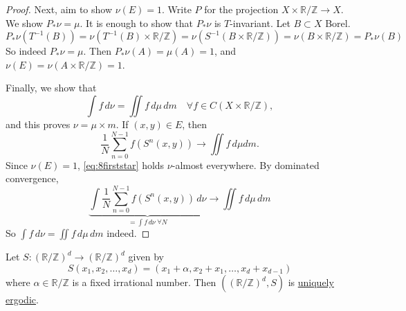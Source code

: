 \documentclass{article}
\begin{document}
\begin{proof}
  Next, aim to show $\nu(E) = 1$.
  Write $P$ for the projection $X \times \mathbb{R} / \mathbb{Z} \to X$. We show $P_* \nu = \mu$.
  It is enough to show that $P_* \nu$ is $T$-invariant.
  Let $B \subset X$ Borel.
  \begin{equation*}
    P_* \nu(T^{-1}(B)) = \nu(T^{-1} (B) \times \mathbb{R}/\mathbb{Z}) = \nu(S^{-1} (B \times \mathbb{R}/\mathbb{Z})) = \nu(B \times \mathbb{R}/\mathbb{Z}) = P_*\nu(B)
  \end{equation*}
  So indeed $P_*\nu= \mu$.
  Then $P_*\nu(A) = \mu(A) = 1$, and $\nu(E) = \nu(A \times \mathbb{R}/\mathbb{Z}) = 1$.

  Finally, we show that
  \begin{equation*}
    \int f\,d\nu=\iint f\,d\mu\,dm \quad \forall f \in C(X \times \mathbb{R}/\mathbb{Z}),
  \end{equation*}
  and this proves $\nu = \mu \times m$.
  If $(x,y) \in E$, then
  \begin{equation*}
    \frac{1}{N} \sum_{n=0}^{N-1} f(S^n(x,y)) \to \iint f \, d\mu dm. \tag{$*$} \label{eq:8firststar}
  \end{equation*}
  Since $\nu(E) = 1$, \eqref{eq:8firststar} holds $\nu$-almost everywhere.
  By dominated convergence,
  \begin{equation*}
    \underbrace{\int \frac{1}{N} \sum_{n=0}^{N-1} f(S^n(x,y))\, d\nu }_{=\int\!f\,d\nu \; \forall N} \to \iint f\,d\mu\,dm %
  \end{equation*}
  So $\int f \,d\nu = \iint f\,d\mu\,dm$ indeed.
\end{proof}
\begin{cor}
  Let $S : (\mathbb{R}/\mathbb{Z})^d \to (\mathbb{R}/\mathbb{Z})^d$ given by
  \begin{equation*}
    S(x_1, x_2, \dotsc, x_d) = (x_1 + \alpha, x_2 + x_1, \dotsc, x_d+x_{d-1})
  \end{equation*}
  where $\alpha \in \mathbb{R}/\mathbb{Z}$ is a fixed irrational number.
  Then $((\mathbb{R}/\mathbb{Z})^d, S)$ is \hyperlink{def:uerg}{uniquely ergodic}.
\end{cor}
\end{document}

